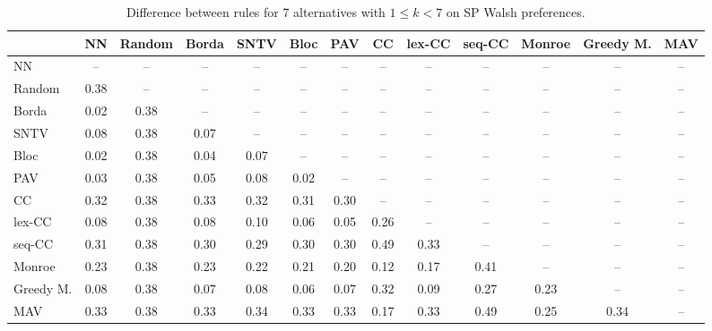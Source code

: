 
\begin{table*}[h!]
\centering
\begin{tabular}{lcccccccccccc}
\toprule
 & NN & Random & Borda & SNTV & Bloc & PAV & CC & lex-CC & seq-CC & Monroe & Greedy M. & MAV \\
\midrule
NN & -- & -- & -- & -- & -- & -- & -- & -- & -- & -- & -- & -- \\
Random & 0.38 & -- & -- & -- & -- & -- & -- & -- & -- & -- & -- & -- \\
Borda & 0.02 & 0.38 & -- & -- & -- & -- & -- & -- & -- & -- & -- & -- \\
SNTV & 0.08 & 0.38 & 0.07 & -- & -- & -- & -- & -- & -- & -- & -- & -- \\
Bloc & 0.02 & 0.38 & 0.04 & 0.07 & -- & -- & -- & -- & -- & -- & -- & -- \\
PAV & 0.03 & 0.38 & 0.05 & 0.08 & 0.02 & -- & -- & -- & -- & -- & -- & -- \\
CC & 0.32 & 0.38 & 0.33 & 0.32 & 0.31 & 0.30 & -- & -- & -- & -- & -- & -- \\
lex-CC & 0.08 & 0.38 & 0.08 & 0.10 & 0.06 & 0.05 & 0.26 & -- & -- & -- & -- & -- \\
seq-CC & 0.31 & 0.38 & 0.30 & 0.29 & 0.30 & 0.30 & 0.49 & 0.33 & -- & -- & -- & -- \\
Monroe & 0.23 & 0.38 & 0.23 & 0.22 & 0.21 & 0.20 & 0.12 & 0.17 & 0.41 & -- & -- & -- \\
Greedy M. & 0.08 & 0.38 & 0.07 & 0.08 & 0.06 & 0.07 & 0.32 & 0.09 & 0.27 & 0.23 & -- & -- \\
MAV & 0.33 & 0.38 & 0.33 & 0.34 & 0.33 & 0.33 & 0.17 & 0.33 & 0.49 & 0.25 & 0.34 & -- \\
\bottomrule
\end{tabular}

\caption{Difference between rules for 7 alternatives with $1 \leq k < 7$ on SP Walsh preferences.}
\end{table*}
